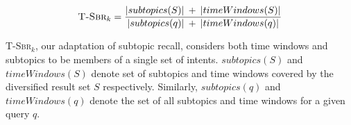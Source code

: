 \begin{equation}
\textsc{T-Sbr}_k =\frac{ |subtopics(S)|\:  +\:  |timeWindows(S)| }{|subtopics(q)|\:  +\:  |timeWindows(q)|}
\end{equation}

\textsc{T-Sbr}$_k$, our adaptation of subtopic recall, considers both time windows and subtopics to be members of a single set of intents. $subtopics(S)$ and $timeWindows(S)$  denote set of subtopics and time windows covered by the diversified result set $S$ respectively. Similarly,  $subtopics(q)$ and $timeWindows(q)$ denote the set of all subtopics and time windows for a given query $q$.








